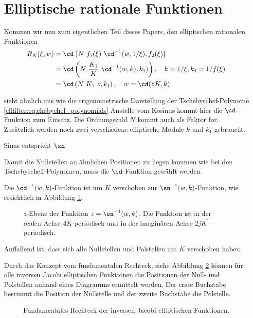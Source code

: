 \section{Elliptische rationale Funktionen}

Kommen wir nun zum eigentlichen Teil dieses Papers, den elliptischen rationalen Funktionen
\begin{align}
    R_N(\xi, w) &= \cd \left(N~f_1(\xi)~\cd^{-1}(w, 1/\xi), f_2(\xi)\right) \\
                &= \cd \left(N~\frac{K_1}{K}~\cd^{-1}(w, k), k_1)\right) , \quad k= 1/\xi, k_1 = 1/f(\xi) \\
                &= \cd \left(N~K_1~z , k_1 \right), \quad w= \cd(z K, k)
\end{align}


sieht ähnlich aus wie die trigonometrische Darstellung der Tschebyschef-Polynome \eqref{ellfilter:eq:chebychef_polynomials}
Anstelle vom Kosinus kommt hier die $\cd$-Funktion zum Einsatz.
Die Ordnungszahl $N$ kommt auch als Faktor for.
Zusätzlich werden noch zwei verschiedene elliptische Module $k$ und $k_1$ gebraucht.



Sinus entspricht $\sn$

Damit die Nullstellen an ähnlichen Positionen zu liegen kommen wie bei den Tschebyscheff-Polynomen, muss die $\cd$-Funktion gewählt werden.

Die $\cd^{-1}(w, k)$-Funktion ist um $K$ verschoben zur $\sn^{-1}(w, k)$-Funktion, wie ersichtlich in Abbildung \ref{ellfilter:fig:cd}.
\begin{figure}
    \centering
    
    \caption{
        $z$-Ebene der Funktion $z = \sn^{-1}(w, k)$.
        Die Funktion ist in der realen Achse $4K$-periodisch und in der imaginären Achse $2jK^\prime$-periodisch.
    }
    \label{ellfilter:fig:cd}
\end{figure}
Auffallend ist, dass sich alle Nullstellen und Polstellen um $K$ verschoben haben.

Durch das Konzept vom fundamentalen Rechteck, siehe Abbildung \ref{ellfilter:fig:fundamental_rectangle} können für alle inversen Jacobi elliptischen Funktionen die Positionen der Null- und Polstellen anhand eines Diagramms ermittelt werden.
Der erste Buchstabe bestimmt die Position der Nullstelle und der zweite Buchstabe die Polstelle.
\begin{figure}
    \centering
    
    \caption{
        Fundamentales Rechteck der inversen Jacobi elliptischen Funktionen.
    }
    \label{ellfilter:fig:fundamental_rectangle}
\end{figure}


